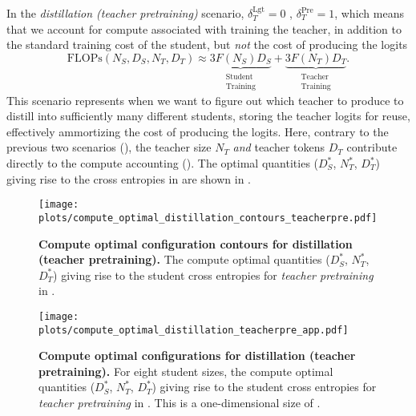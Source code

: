 In the \emph{distillation (teacher pretraining)} scenario, 
$\delta_T^{\mathrm{Lgt}}=0$ , $\delta_T^{\mathrm{Pre}}=1$,
which means that we  account for compute associated with training the teacher, in addition to the standard training cost of the student, but \emph{not} the cost of producing the logits
\begin{equation}
    \mathrm{FLOPs}(N_S,D_S,N_T,D_T)\approx
    \underbrace{3F(N_S)D_S}_{\substack{\mathrm{Student}\\\mathrm{Training}}}
    +\underbrace{3F(N_T)D_T}_{\substack{\mathrm{Teacher}\\\mathrm{Training}}}.
    \label{eq:compute-teacher-pretraining}
\end{equation}
This scenario represents when we want to figure out which teacher to produce to distill into sufficiently many different students,
storing the teacher logits for reuse,
effectively ammortizing the cost of producing the logits.
Here, contrary to the previous two scenarios (),
the teacher size $N_T$ \emph{and} teacher tokens $D_T$ contribute directly to the compute accounting ().
The optimal quantities ($D_S^*$, $N_T^*$, $D_T^*$) giving rise to the cross entropies in 
are shown in .

\begin{figure}[h]
	\centering
	\texttt{[image: plots/compute\_optimal\_distillation\_contours\_teacherpre.pdf]}
	\caption{\textbf{Compute optimal configuration contours for distillation (teacher pretraining).} The compute optimal quantities ($D_S^*$, $N_T^*$, $D_T^*$) giving rise to the student cross entropies for \emph{teacher pretraining} in .
	}
	\label{fig:compute-optimal-contours-teacherpre-app}
\end{figure}

\begin{figure}[h]
	\centering
	\texttt{[image: plots/compute\_optimal\_distillation\_teacherpre\_app.pdf]}
	\caption{\textbf{Compute optimal configurations for distillation (teacher pretraining).} For eight student sizes, the compute optimal quantities ($D_S^*$, $N_T^*$, $D_T^*$) giving rise to the student cross entropies for \emph{teacher pretraining} in . This is a one-dimensional size of .
	}
	\label{fig:compute-optimal-distillation-teacherpre-app}
\end{figure}

